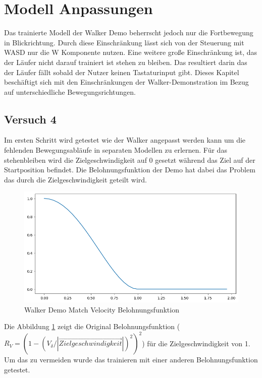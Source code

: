 \section{Modell Anpassungen}
Das trainierte Modell der Walker Demo beherrscht jedoch nur die Fortbewegung in Blickrichtung. Durch diese Einschränkung lässt sich von der Steuerung mit WASD nur die W Komponente nutzen. Eine weitere große Einschränkung ist, das der Läufer nicht darauf trainiert ist stehen zu bleiben. Das resultiert darin das der Läufer fällt sobald der Nutzer keinen Tastaturinput gibt. Dieses Kapitel beschäftigt sich mit den Einschränkungen der Walker-Demonstration im Bezug auf unterschiedliche Bewegungsrichtungen.

\subsection{Versuch 4}
Im ersten Schritt wird getestet wie der Walker angepasst werden kann um die fehlenden Bewegungsabläufe in separaten Modellen zu erlernen.
Für das stehenbleiben wird die Zielgeschwindigkeit auf 0 gesetzt während das Ziel auf der Startposition befindet. Die Belohnungsfunktion der Demo hat dabei das Problem das durch die Zielgeschwindigkeit geteilt wird.\\
\begin{figure}[H]
  \centering  
  \includegraphics[scale=0.5]{img/match_velocity_original_vel1.png}
  \caption{Walker Demo Match Velocity Belohnungsfunktion}
  \label{fig:match_velocity_original_vel1}
\end{figure}
Die Abbildung \ref{fig:match_velocity_original_vel1} zeigt die Original Belohnungsfunktion ($R_V=(1 - (V_\delta / |\vec{Zielgeschwindigkeit}|)^2)^2$) für die Zielgeschwindigkeit von 1. \\
Um das zu vermeiden wurde das trainieren mit einer anderen Belohnungsfunktion getestet.
